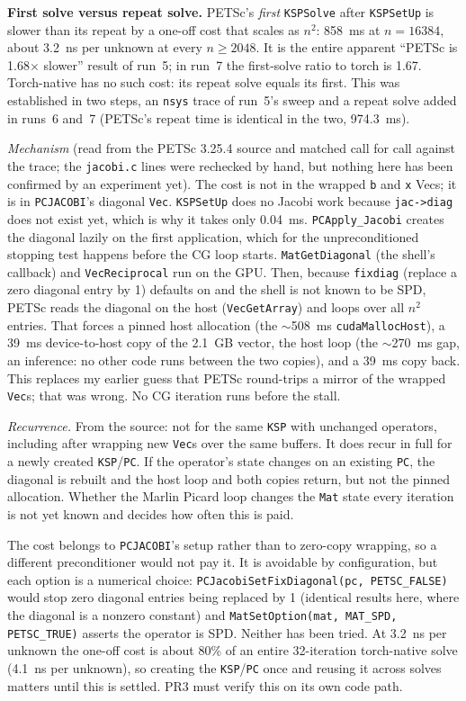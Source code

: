 \documentclass[11pt]{article}
\begin{document}
\textbf{First solve versus repeat solve.} PETSc's \emph{first}
\texttt{KSPSolve} after \texttt{KSPSetUp} is slower than its repeat by a
one-off cost that scales as $n^{2}$: 858~ms at $n=16384$, about 3.2~ns per
unknown at every $n\ge2048$. It is the entire apparent ``PETSc is
1.68$\times$ slower'' result of run~5; in run~7 the first-solve ratio to
torch is 1.67. Torch-native has no such cost: its repeat solve equals its
first. This was established in two steps, an \texttt{nsys} trace of run~5's
sweep and a repeat solve added in runs~6 and~7 (PETSc's repeat time is
identical in the two, 974.3~ms).

\textit{Mechanism} (read from the PETSc 3.25.4 source and matched call for
call against the trace; the \texttt{jacobi.c} lines were rechecked by hand,
but nothing here has been confirmed by an experiment yet). The cost is not in
the wrapped \texttt{b} and \texttt{x} Vecs; it is in \texttt{PCJACOBI}'s
diagonal \texttt{Vec}. \texttt{KSPSetUp} does no Jacobi work because
\texttt{jac->diag} does not exist yet, which is why it takes only 0.04~ms.
\texttt{PCApply\_Jacobi} creates the diagonal lazily on the first
application, which for the unpreconditioned stopping test happens before the
CG loop starts. \texttt{MatGetDiagonal} (the shell's callback) and
\texttt{VecReciprocal} run on the GPU. Then, because \texttt{fixdiag}
(replace a zero diagonal entry by 1) defaults on and the shell is not known
to be SPD, PETSc reads the diagonal on the host (\texttt{VecGetArray}) and
loops over all $n^{2}$ entries. That forces a pinned host allocation (the
$\sim$508~ms \texttt{cudaMallocHost}), a 39~ms device-to-host copy of the
2.1~GB vector, the host loop (the $\sim$270~ms gap, an inference: no other
code runs between the two copies), and a 39~ms copy back. This replaces my
earlier guess that PETSc round-trips a mirror of the wrapped \texttt{Vec}s;
that was wrong. No CG iteration runs before the stall.

\textit{Recurrence.} From the source: not for the same \texttt{KSP} with
unchanged operators, including after wrapping new \texttt{Vec}s over the
same buffers. It does recur in full for a newly created \texttt{KSP}/\texttt{PC}. If
the operator's state changes on an existing \texttt{PC}, the diagonal is
rebuilt and the host loop and both copies return, but not the pinned
allocation. Whether the Marlin Picard loop changes the \texttt{Mat} state
every iteration is not yet known and decides how often this is paid.

The cost belongs to \texttt{PCJACOBI}'s setup rather than to zero-copy
wrapping, so a different preconditioner would not pay it. It is avoidable
by configuration, but each option is a numerical choice:
\texttt{PCJacobiSetFixDiagonal(pc, PETSC\_FALSE)} would stop zero diagonal
entries being replaced by 1 (identical results here, where the diagonal is a
nonzero constant) and \texttt{MatSetOption(mat, MAT\_SPD, PETSC\_TRUE)}
asserts the operator is SPD. Neither has been tried. At 3.2~ns per unknown
the one-off cost is about 80\% of an entire 32-iteration torch-native solve
(4.1~ns per unknown), so creating the \texttt{KSP}/\texttt{PC} once and
reusing it across solves matters until this is settled. PR3 must verify
this on its own code path.
\end{document}
